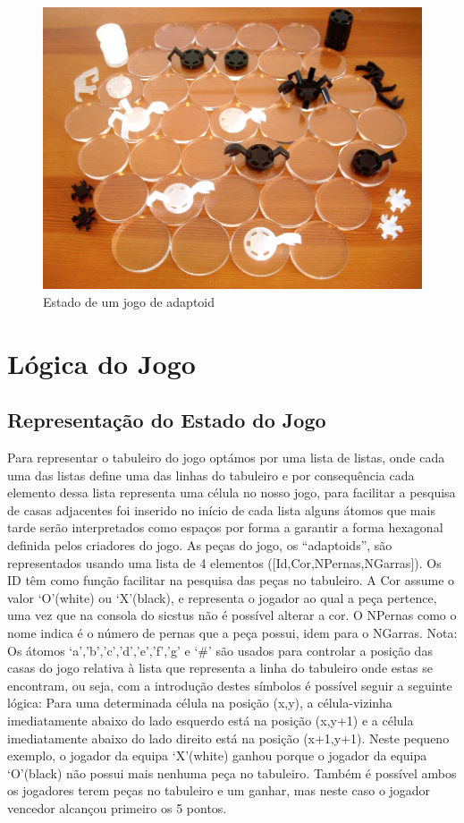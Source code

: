 \documentclass[a4paper]{article}
\begin{document}
\begin{figure}[h]
    \begin{center}
        \includegraphics[scale=0.5]{jogoDecorrer}
        \caption{Estado de um jogo de adaptoid}
        \centering
    \end{center}
\end{figure}

\newpage
\section{Lógica do Jogo}

\subsection{Representação do Estado do Jogo}  Para representar o tabuleiro do jogo optámos por uma lista de listas, onde cada uma das listas define uma das linhas do tabuleiro e por consequência cada elemento dessa lista representa uma célula no nosso jogo,  para facilitar a pesquisa de casas adjacentes foi inserido no início de cada lista alguns átomos que mais tarde serão interpretados como espaços por forma a garantir a forma hexagonal definida pelos criadores do jogo. As peças do jogo, os “adaptoids”, são representados usando uma lista de 4 elementos ([Id,Cor,NPernas,NGarras]). Os ID têm como função facilitar na pesquisa das peças no tabuleiro. A Cor assume o valor ‘O’(white) ou ‘X’(black), e representa o jogador ao qual a peça pertence, uma vez que na consola do sicstus não é possível alterar a cor. O NPernas como o nome indica é o número de pernas que a peça possui, idem para o NGarras. Nota: Os átomos ‘a’,’b’,’c’,'d','e','f','g' e ‘\#’ são usados para controlar a posição das casas do jogo relativa à lista que representa a linha do tabuleiro onde estas se encontram, ou seja, com a introdução destes símbolos é possível seguir a seguinte lógica: Para uma determinada célula na posição (x,y), a célula-vizinha imediatamente abaixo do lado esquerdo está na posição (x,y+1) e a célula imediatamente abaixo do lado direito está na posição (x+1,y+1). Neste pequeno exemplo, o jogador da equipa ‘X’(white) ganhou porque o jogador da equipa ‘O’(black) não possui mais nenhuma peça no tabuleiro. Também é possível ambos os jogadores terem peças no tabuleiro e um ganhar, mas neste caso o jogador vencedor alcançou primeiro os 5 pontos.
\end{document}
